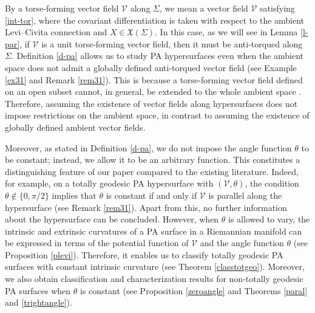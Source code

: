 \documentclass[12pt,reqno]{amsart}
\def\v{\mathcal V}
\theoremstyle{definition}
\begin{document}

By a torse-forming vector field $\v$ along $\Sigma$, we mean a vector field $\v$ satisfying \eqref{int-tor}, where the covariant differentiation is taken with respect to the ambient Levi--Civita connection and $X\in \mathfrak{X}(\Sigma)$.
In this case, as we will see in Lemma \ref{l-par}, if $\v$ is a unit torse-forming vector field, then it must be anti-torqued along $\Sigma$. Definition \ref{d-pa} allows us to study PA hypersurfaces even when the ambient space does not admit a globally defined anti-torqued vector field (see Example \ref{ex31} and Remark \ref{rem31}). This is because a torse-forming vector field defined on an open subset cannot, in general, be extended to the whole ambient space \cite{amc,dta}. Therefore, assuming the existence of vector fields along hypersurfaces does not impose restrictions on the ambient space, in contrast to assuming the existence of globally defined ambient vector fields.


Moreover, as stated in Definition \ref{d-pa}, we do not impose the angle function $\theta$ to be constant; instead, we allow it to be an arbitrary function. This constitutes a distinguishing feature of our paper compared to the existing literature. Indeed, for example, on a totally geodesic PA hypersurface with $(\v,\theta)$, the condition $\theta \notin \{0,\pi/2\}$ implies that $\theta$ is constant if and only if $\v$ is parallel along the hypersurface (see Remark \ref{rem31}). Apart from this, no further information about the hypersurface can be concluded. However, when $\theta$ is allowed to vary, the intrinsic and extrinsic curvatures of a PA surface in a Riemannian manifold can be expressed in terms of the potential function of $\v$ and the angle function $\theta$ (see Proposition \ref{plevi}). Therefore,  it enables us to classify totally geodesic PA surfaces with constant intrinsic curvature (see Theorem \ref{classtotgeo}). Moreover, we also obtain classification and characterization results for non-totally geodesic PA surfaces when $\theta$ is constant (see Proposition \ref{zeroangle} and Theorems \ref{paral} and \ref{trightangle}).
\end{document}
